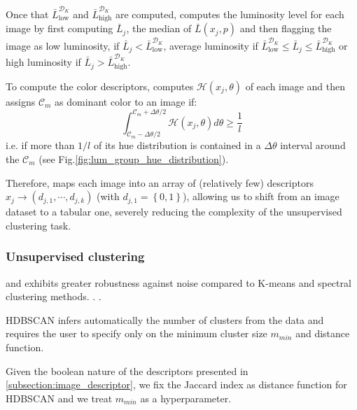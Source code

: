 \documentclass[12pt]{spieman}  %
\begin{document}
\begin{spacing}{2}
\begin{linenumbers}
Once that $\bar{L}^{\mathcal{D}_K}_{\mathrm{low}}$ and $\bar{L}^{\mathcal{D}_K}_{\mathrm{high}}$ are computed, \clustname computes the luminosity level for each image  by first computing $\bar{L}_j$, the median of $\bar{L}(x_j, p)$ and then flagging the image  as low luminosity, if $\bar{L}_j < \bar{L}^{\mathcal{D}_K}_{\mathrm{low}}$, average luminosity  if $ \bar{L}^{\mathcal{D}_K}_{\mathrm{low}} \leq \bar{L}_j \leq \bar{L}^{\mathcal{D}_K}_{\mathrm{high}}$ or high luminosity if $\bar{L}_j > \bar{L}^{\mathcal{D}_K}_{\mathrm{high}} $. 



To compute the color descriptors, \clustname computes $\mathcal{H}(x_j, \theta)$ of each image and then assigns $\mathcal{C}_m$ as dominant color to an image if:
\begin{equation}
	 \int_{\mathcal{C}_m - \Delta \theta / 2}^{\mathcal{C}_m + \Delta \theta / 2 }  \mathcal{H}(x_j, \theta) d \theta \geq  \frac{1}{l}
	 \label{eq:dom_colors}
\end{equation}
i.e. if more than $1/l$ of its hue distribution is contained in a $\Delta \theta$ interval around the $\mathcal{C}_m$ (see Fig.\ref{fig:lum_group_hue_distribution}). 


Therefore, \clustname maps each image  into an array of (relatively few) descriptors $x_j \rightarrow \left ( d_{j,1}, \cdots, d_{j,k} \right )$ (with  $d_{j,1}=\left \{ 0,1  \right \}$),  allowing us to shift from an image dataset to a tabular one, severely reducing the complexity of the unsupervised clustering task.



\subsubsection{Unsupervised clustering}
\label{subsection:unsuper_clustering}


  \cite{CampelloHDBSCAN}  { and exhibits greater robustness against noise compared to K-means and spectral clustering methods. }. \cite{baligodugula2025unsupervisedlearningcomparativeanalysis}. 


 {HDBSCAN  infers automatically the number of clusters from the data and requires the user to specify only on the minimum cluster size $m_{min}$  and distance function.}
	
	
 {Given the boolean nature of the descriptors presented in} \ref{subsection:image_descriptor},  {we fix the Jaccard index as distance function for HDBSCAN and we treat  $m_{min}$ as a hyperparameter.}


\end{linenumbers}
\end{spacing}
\end{document}
